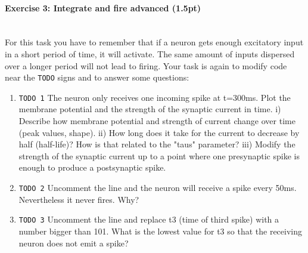 \documentclass[a4paper,11pt]{article}
\newenvironment{exercise}[3]{\paragraph{Exercise #1: #2 (#3pt)}\ \\}{
\medskip}
\begin{document}
\begin{exercise}{3}{Integrate and fire advanced}{1.5}
For this task you have to remember that if a neuron gets enough excitatory input in a short period of time, it will activate. The same amount of inputs dispersed over a longer period will not lead to firing. Your task is again to modify code near the \texttt{TODO} signs and to answer some questions:
\begin{enumerate}
	\item \texttt{TODO 1} The neuron only receives one incoming spike at t=300ms. Plot the membrane potential and the strength of the synaptic current in time. i) Describe how membrane potential and strength of current change over time (peak values, shape). ii) How long does it take for the current to decrease by half (half-life)? How is that related to the "taus" parameter? iii) Modify the strength of the synaptic current up to a point where one presynaptic spike is enough to produce a postsynaptic spike.
	\item \texttt{TODO 2} Uncomment the line and the neuron will receive a spike every 50ms. Nevertheless it never fires. Why?
	\item \texttt{TODO 3} Uncomment the line and replace t3 (time of third spike) with a number bigger than 101. What is the lowest value for t3 so that the receiving neuron does not emit a spike?
\end{enumerate}
\end{exercise}
\end{document}
